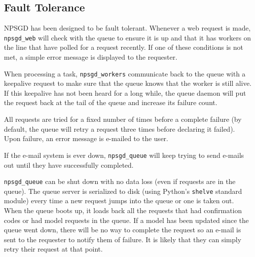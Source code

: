 \documentclass{article}
\begin{document}
\subsection{Fault Tolerance}
NPSGD has been designed to be fault tolerant. Whenever a web request is made,
\texttt{npsgd\_web} will check with the queue to ensure it is up and that it has
workers on the line that have polled for a request recently. If one of these
conditions is not met, a simple error message is displayed to the requester.

When processing a task, \texttt{npsgd\_workers} communicate back to the queue
with a keepalive request to make sure that the queue knows that the worker is
still alive. If this keepalive has not been heard for a long while, the queue
daemon will put the request back at the tail of the queue and increase its failure count.

All requests are tried for a fixed number of times before a complete failure (by
default, the queue will retry a request three times before declaring it failed).
Upon failure, an error message is e-mailed to the user.

If the e-mail system is ever down, \texttt{npsgd\_queue} will keep trying to send e-mails out
until they have successfully completed.

\texttt{npsgd\_queue} can be shut down with no data loss (even if requests are
in the queue).
The queue server is serialized to disk (using Python's \texttt{shelve} standard
module) every time a new request jumps into the
queue or one is taken out. When the queue boots up, it loads back all the
requests that had confirmation codes or had model requests in the queue. If
a model has been updated since the queue went down, there will be no way to
complete the request so an e-mail is sent to the requester to notify them of
failure. It is likely that they can simply retry their request at that point.
\end{document}

